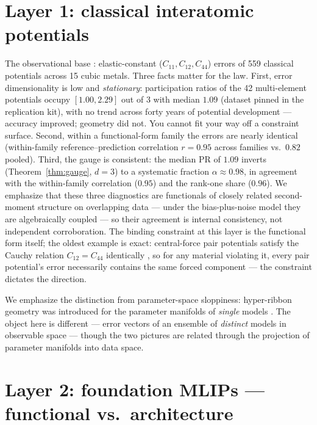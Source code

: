 \documentclass[11pt]{article}
\begin{document}
\section{Layer 1: classical interatomic potentials}
\label{sec:classical}

The observational base \citep{welcing2026instance}: elastic-constant
($C_{11}, C_{12}, C_{44}$) errors of 559 classical potentials across 15 cubic
metals. Three facts matter for the law. First, error dimensionality is low and
\emph{stationary}: participation ratios of the 42 multi-element potentials
occupy $[1.00, 2.29]$ out of 3 with median $1.09$ (dataset pinned in the
replication kit), with no trend across forty years of potential development
--- accuracy improved; geometry did not. You cannot fit your way off a
constraint surface. Second, within a functional-form family the errors are
nearly identical (within-family reference--prediction correlation $r = 0.95$
across families vs.\ $0.82$ pooled). Third, the gauge is consistent: the
median PR of $1.09$ inverts (Theorem~\ref{thm:gauge}, $d{=}3$) to a systematic
fraction $\alpha \approx 0.98$, in agreement with the within-family
correlation ($0.95$) and the rank-one share ($0.96$). We emphasize that these
three diagnostics are functionals of closely related second-moment structure
on overlapping data --- under the bias-plus-noise model they are algebraically
coupled --- so their agreement is internal consistency, not independent
corroboration. The binding constraint at this layer is the functional form
itself; the oldest example is exact: central-force pair potentials satisfy
the Cauchy relation $C_{12}=C_{44}$ identically \citep{born1954}, so for any
material violating it, every pair potential's error necessarily contains the
same forced component --- the constraint dictates the direction.

We emphasize the distinction from parameter-space sloppiness: hyper-ribbon
geometry was introduced for the parameter manifolds of \emph{single} models
\citep{transtrum2011,machta2013,quinn2023,kurniawan2022}. The object here is
different --- error vectors of an ensemble of \emph{distinct} models in
observable space --- though the two pictures are related through the
projection of parameter manifolds into data space.

\section{Layer 2: foundation MLIPs --- functional vs.\ architecture}
\label{sec:mlip}
\end{document}
